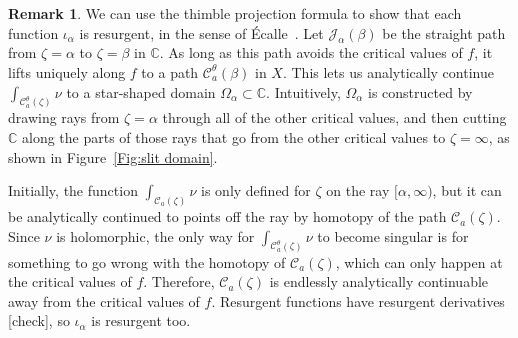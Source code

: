 \documentclass{article}
\newcommand{\C}{\mathbb{C}}
\theoremstyle{definition}
\newtheorem{remark}[definition]{Remark}
\theoremstyle{plain}
\newenvironment{todo}{\color{Coral}}{\color{black}}
\newenvironment{revised}{\color{DarkBlue}}{\color{black}}
\newenvironment{revised}{}{}
\begin{document}
\begin{remark}
\begin{revised}We can use the thimble projection formula to show that each function $\iota_\alpha$ is resurgent, in the sense of \'{E}calle~\cite[Section~1]{EcalleI}. Let $\mathcal{J}_\alpha(\beta)$ be the straight path from $\zeta = \alpha$ to $\zeta = \beta$ in $\C$. As long as this path avoids the critical values of $f$, it lifts uniquely along $f$ to a path $\mathcal{C}_a^\theta(\beta)$ in $X$. This lets us analytically continue $\int_{\mathcal{C}_a^\theta(\zeta)} \nu$ to a star-shaped domain $\Omega_\alpha \subset \C$. Intuitively, $\Omega_\alpha$ is constructed by drawing rays from $\zeta = \alpha$ through all of the other critical values, and then cutting $\C$ along the parts of those rays that go from the other critical values to $\zeta = \infty$, as shown in Figure~\ref{Fig:slit domain}.\end{revised}
\begin{center}
\label{Fig:slit domain}
\end{center}
\begin{revised}Initially, the function $\int_{\mathcal{C}_a(\zeta)} \nu$ is only defined for $\zeta$ on the ray $[\alpha, \infty)$, but it can be analytically continued to points off the ray by homotopy of the path $\mathcal{C}_a(\zeta)$. Since $\nu$ is holomorphic, the only way for $\int_{\mathcal{C}^\theta_a(\zeta)} \nu$ to become singular is for something to go wrong with the homotopy of $\mathcal{C}_a(\zeta)$, which can only happen at the critical values of $f$. Therefore, $\mathcal{C}_a(\zeta)$ is endlessly analytically continuable away from the critical values of $f$. Resurgent functions have resurgent derivatives \begin{todo}[check]\end{todo}, so $\iota_\alpha$ is resurgent too.\end{revised}

\end{remark}
\end{document}
